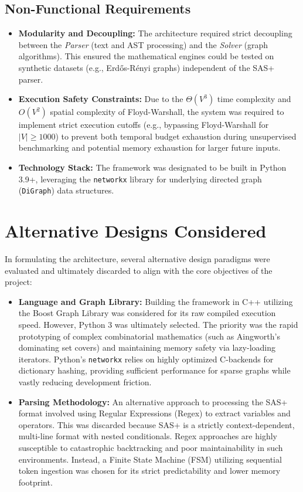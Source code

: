 \subsection{Non-Functional Requirements}
\begin{itemize}
    \item \textbf{Modularity and Decoupling:} The architecture required strict decoupling between the \textit{Parser} (text and AST processing) and the \textit{Solver} (graph algorithms). This ensured the mathematical engines could be tested on synthetic datasets (e.g., Erdős-Rényi graphs) independent of the SAS+ parser.
    \item \textbf{Execution Safety Constraints:} Due to the $\Theta(V^3)$ time complexity and $O(V^2)$ spatial complexity of Floyd-Warshall, the system was required to implement strict execution cutoffs (e.g., bypassing Floyd-Warshall for $|V| \geq 1000$) to prevent both temporal budget exhaustion during unsupervised benchmarking and potential memory exhaustion for larger future inputs.
    \item \textbf{Technology Stack:} The framework was designated to be built in Python 3.9+, leveraging the \texttt{networkx} library for underlying directed graph (\texttt{DiGraph}) data structures.
\end{itemize}

\section{Alternative Designs Considered}
In formulating the architecture, several alternative design paradigms were evaluated and ultimately discarded to align with the core objectives of the project:
\begin{itemize}
    \item \textbf{Language and Graph Library:} Building the framework in C++ utilizing the Boost Graph Library was considered for its raw compiled execution speed. However, Python 3 was ultimately selected. The priority was the rapid prototyping of complex combinatorial mathematics (such as Aingworth's dominating set covers) and maintaining memory safety via lazy-loading iterators. Python's \texttt{networkx} relies on highly optimized C-backends for dictionary hashing, providing sufficient performance for sparse graphs while vastly reducing development friction.
    \item \textbf{Parsing Methodology:} An alternative approach to processing the SAS+ format involved using Regular Expressions (Regex) to extract variables and operators. This was discarded because SAS+ is a strictly context-dependent, multi-line format with nested conditionals. Regex approaches are highly susceptible to catastrophic backtracking and poor maintainability in such environments. Instead, a Finite State Machine (FSM) utilizing sequential token ingestion was chosen for its strict predictability and lower memory footprint.
\end{itemize}

